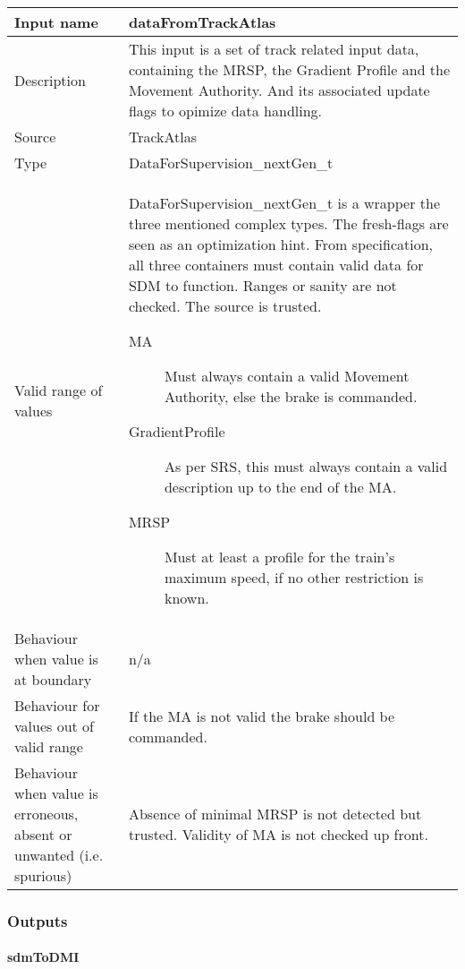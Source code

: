 \begin{longtable}{p{}p{}}
\toprule
Input name				& dataFromTrackAtlas \\
\midrule
Description				& This input is a set of track related input data, containing the MRSP, the Gradient Profile and the Movement Authority. And its associated update flags to opimize data handling.\\
\midrule
Source					& TrackAtlas \\ 
\midrule
Type					& DataForSupervision\_nextGen\_t \\
\midrule
Valid range of values	& DataForSupervision\_nextGen\_t is a wrapper the three mentioned complex types. The fresh-flags are seen as an optimization hint. From specification, all three containers must contain valid data for SDM to function. Ranges or sanity are not checked. The source is trusted.
\begin{description}
\item[MA] Must always contain a valid Movement Authority, else the brake is commanded.
\item[GradientProfile] As per SRS, this must always contain a valid description up to the end of the MA.
\item[MRSP] Must at least a profile for the train's maximum speed, if no other restriction is known.
\end{description}\\
\midrule
Behaviour when value is at boundary	& n/a \\
\midrule
Behaviour for values out of valid range	& If the MA is not valid the brake should be commanded. \\
\midrule
Behaviour when value is erroneous, absent or unwanted (i.e. spurious) & Absence of minimal MRSP is not detected but trusted. Validity of MA is not checked up front.\\
\bottomrule
\end{longtable}


\subsubsection{Outputs}\label{s:SDM_outputs}

\paragraph{sdmToDMI}

